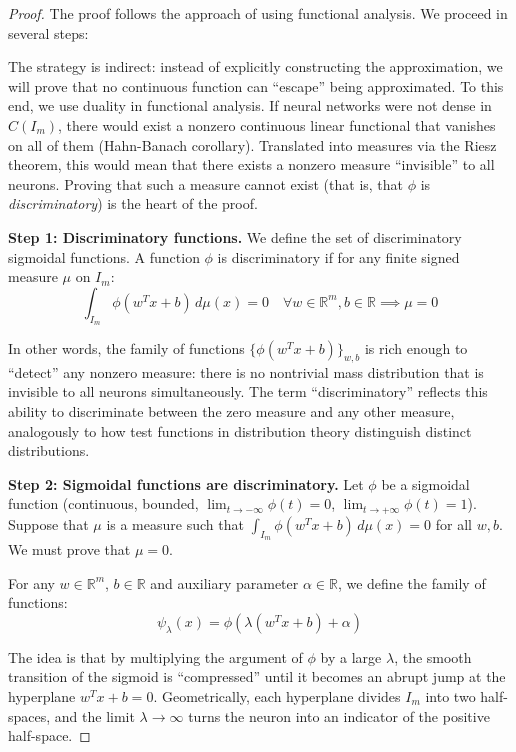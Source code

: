 \begin{proof}
	The proof follows the approach of \citet{cybenko1989} using functional analysis. We proceed in several steps:

	The strategy is indirect: instead of explicitly constructing the approximation, we will prove that no continuous function can ``escape'' being approximated. To this end, we use duality in functional analysis. If neural networks were not dense in \(C(I_m)\), there would exist a nonzero continuous linear functional that vanishes on all of them (Hahn-Banach corollary). Translated into measures via the Riesz theorem, this would mean that there exists a nonzero measure ``invisible'' to all neurons. Proving that such a measure cannot exist (that is, that \(\phi\) is \textit{discriminatory}) is the heart of the proof.

	\textbf{Step 1: Discriminatory functions.}
	We define the set of discriminatory sigmoidal functions. A function \(\phi\) is discriminatory if for any finite signed measure \(\mu\) on \(I_m\):
	\[
		\int_{I_m} \phi(w^T x + b) \, d\mu(x) = 0 \quad \forall w \in \mathbb{R}^m, b \in \mathbb{R} \implies \mu = 0
	\]

	In other words, the family of functions \(\{\phi(w^T x + b)\}_{w,b}\) is rich enough to ``detect'' any nonzero measure: there is no nontrivial mass distribution that is invisible to all neurons simultaneously. The term ``discriminatory'' reflects this ability to discriminate between the zero measure and any other measure, analogously to how test functions in distribution theory distinguish distinct distributions.

	\textbf{Step 2: Sigmoidal functions are discriminatory.}
	Let \(\phi\) be a sigmoidal function (continuous, bounded, \(\lim_{t \to -\infty} \phi(t) = 0\), \(\lim_{t \to +\infty} \phi(t) = 1\)). Suppose that \(\mu\) is a measure such that \(\int_{I_m} \phi(w^T x + b) \, d\mu(x) = 0\) for all \(w, b\). We must prove that \(\mu = 0\).

	For any \(w \in \mathbb{R}^m\), \(b \in \mathbb{R}\) and auxiliary parameter \(\alpha \in \mathbb{R}\), we define the family of functions:
	\[
		\psi_{\lambda}(x) = \phi(\lambda(w^T x + b) + \alpha)
	\]

	The idea is that by multiplying the argument of \(\phi\) by a large \(\lambda\), the smooth transition of the sigmoid is ``compressed'' until it becomes an abrupt jump at the hyperplane \(w^T x + b = 0\). Geometrically, each hyperplane divides \(I_m\) into two half-spaces, and the limit \(\lambda \to \infty\) turns the neuron into an indicator of the positive half-space.


\end{proof}
